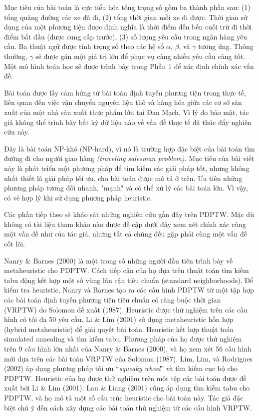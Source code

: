 Mục tiêu của bài toán là cực tiểu hóa tổng trọng số gồm ba thành phần sau: (1) tổng quãng đường các xe đã đi, (2) tổng thời gian mỗi xe đi được. Thời gian sử dụng của một phương tiện được định nghĩa là thời điểm đến bến cuối trừ đi thời điểm bắt đầu (được cung cấp trước), (3) số lượng yêu cầu trong ngân hàng yêu cầu.
Ba thuật ngữ được tính trọng số theo các hệ số $\alpha$, $\beta$, và $\gamma$ tương ứng. Thông thường, $\gamma$ sẽ được gán một giá trị lớn để phục vụ càng nhiều yêu cầu càng tốt. Một mô hình toán học sẽ được trình bày trong Phần 1 để xác định chính xác vấn đề.

Bài toán được lấy cảm hứng từ bài toán định tuyến phương tiện trong thực tế, liên quan đến việc vận chuyển nguyên liệu thô và hàng hóa giữa các cơ sở sản xuất của một nhà sản xuất thực phẩm lớn tại Đan Mạch. Vì lý do bảo mật, tác giả không thể trình bày bất kỳ dữ liệu nào về vấn đề thực tế đã thúc đẩy nghiên cứu này.

Đây là bài toán NP-khó (NP-hard), vì nó là trường hợp đặc biệt của bài toán tìm đường đi cho người giao hàng \textit{(traveling salesman problem)}. Mục tiêu của bài viết này là phát triển một phương pháp để tìm kiếm các giải pháp tốt, nhưng không nhất thiết là giải pháp tối ưu, cho bài toán được mô tả ở trên. Ưu tiên những phương pháp tương đối nhanh, "mạnh" và có thể xử lý các bài toán lớn. Vì vậy, có vẻ hợp lý khi sử dụng phương pháp heuristic.

Các phần tiếp theo sẽ khảo sát những nghiên cứu gần đây trên PDPTW. Mặc dù không có tài liệu tham khảo nào được đề cập dưới đây xem xét chính xác cùng một vấn đề như của tác giả, nhưng tất cả chúng đều gặp phải cùng một vấn đề cốt lõi.

Nanry \& Barnes (2000) là một trong số những người đầu tiên trình bày về metaheuristic cho PDPTW. Cách tiếp cận của họ dựa trên thuật toán tìm kiếm tabu động kết hợp một số vùng lân cận tiêu chuẩn (standard neighborhoods). Để kiểm tra heuristic, Nanry và Barnes tạo ra các cấu hình PDPTW từ một tập hợp các bài toán định tuyến phương tiện tiêu chuẩn có ràng buộc thời gian (VRPTW) do Solomon đề xuất (1987). Heuristic được thử nghiệm trên các cấu hình có tối đa 50 yêu cầu. Li \& Lim (2001) sử dụng metaheuristic hỗn hợp (hybrid metaheuristic) để giải quyết bài toán. Heuristic kết hợp thuật toán simulated annealing và tìm kiếm tabu. Phương pháp của họ được thử nghiệm trên 9 cấu hình lớn nhất của Nanry \& Barnes (2000), và họ xem xét 56 cấu hình mới dựa trên các bài toán VRPTW của Solomon (1987).
Lim, Lim, và Rodrigues (2002) áp dụng phương pháp tối ưu “\textit{squeaky wheel}” và tìm kiếm cục bộ cho PDPTW. Heuristic của họ được thử nghiệm trên một tệp các bài toán được đề xuất bởi Li \& Lim (2001). Lau \& Liang (2001) cũng áp dụng tìm kiếm tabu cho PDPTW, và họ mô tả một số cấu trúc heuristic cho bài toán này. Tác giả đặc biệt chú ý đến cách xây dựng các bài toán thử nghiệm từ các cấu hình VRPTW.

